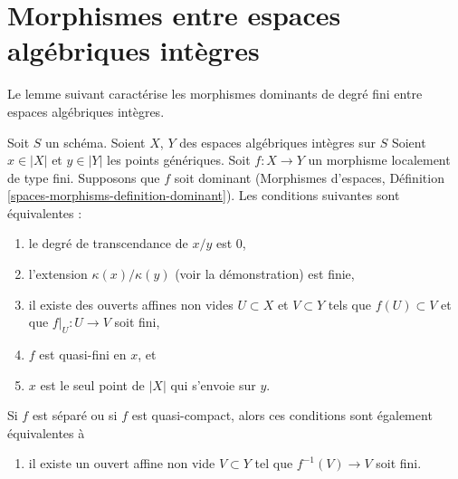 \section{Morphismes entre espaces algébriques intègres}
\label{section-morphisms-between-integral-spaces}

\noindent
Le lemme suivant caractérise les morphismes dominants de degré fini
entre espaces algébriques intègres.

\begin{lemma}
\label{lemma-finite-degree}
Soit $S$ un schéma. Soient $X$, $Y$ des espaces algébriques intègres sur $S$
Soient $x \in |X|$ et $y \in |Y|$ les points génériques. Soit $f : X \to Y$
un morphisme localement de type fini. Supposons que $f$ soit dominant
(Morphismes d'espaces, Définition \ref{spaces-morphisms-definition-dominant}).
Les conditions suivantes sont équivalentes :
\begin{enumerate}
\item le degré de transcendance de $x/y$ est $0$,
\item l'extension $\kappa(x)/\kappa(y)$ (voir la démonstration) est finie,
\item il existe des ouverts affines non vides $U \subset X$ et $V \subset Y$
tels que $f(U) \subset V$ et que $f|_U : U \to V$ soit fini,
\item $f$ est quasi-fini en $x$, et
\item $x$ est le seul point de $|X|$ qui s'envoie sur $y$.
\end{enumerate}
Si $f$ est séparé ou si $f$ est quasi-compact, alors ces conditions sont
également équivalentes à
\begin{enumerate}
\item[(6)] il existe un ouvert affine non vide $V \subset Y$ tel
que $f^{-1}(V) \to V$ soit fini.
\end{enumerate}
\end{lemma}

